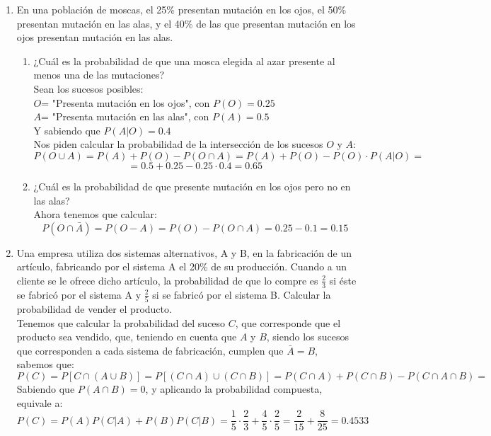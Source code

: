 \documentclass[a4paper,12pt]{article}
\begin{document}
\begin{enumerate}[label=\textbf{\arabic*.}]
\begin{enumerate}[label=\alph*)]
    \end{enumerate}
    

    \item En una población de moscas, el 25\% presentan mutación en los ojos, el 50\% presentan mutación en las alas, y el 40\% de las que presentan mutación en los ojos presentan mutación en las alas.
    
    \begin{enumerate}
        \item ¿Cuál es la probabilidad de que una mosca elegida al azar presente al menos una de las mutaciones?\\
        Sean los sucesos posibles:\\
        $O$= "Presenta mutación en los ojos", con $P(O)=0.25$\\
        $A$= "Presenta mutación en las alas", con $P(A)=0.5$\\
        Y sabiendo que $P(A|O)=0.4$\\
        Nos piden calcular la probabilidad de la intersección de los sucesos $O$ y $A$:
        $$P(O\cup A)= P(A)+P(O)-P(O\cap A)= P(A)+P(O)-P(O)\cdot P(A|O)=$$
        $$=0.5+0.25-0.25\cdot 0.4=0.65$$
        
        \item ¿Cuál es la probabilidad de que presente mutación en los ojos pero no en las alas?\\

        Ahora tenemos que calcular:
        $$P(O\cap \bar A)= P(O-A)= P(O)-P(O\cap A)=0.25-0.1=0.15$$
    \end{enumerate}
    
    \item Una empresa utiliza dos sistemas alternativos, A y B, en la fabricación de un artículo, fabricando por el sistema A el 20\% de su producción. Cuando a un cliente se le ofrece dicho artículo, la probabilidad de que lo compre es \( \frac{2}{3} \) si éste se fabricó por el sistema A y \( \frac{2}{5} \) si se fabricó por el sistema B. Calcular la probabilidad de vender el producto.\\

    Tenemos que calcular la probabilidad del suceso $C$, que corresponde  que el producto sea vendido, que, teniendo en cuenta que $A$ y $B$, siendo los sucesos que corresponden a cada sistema de fabricación, cumplen que $\bar A = B$, sabemos que:
    $$P(C)=P[C\cap (A\cup B)]=P[ (C\cap A) \cup (C\cap B)]=P(C\cap A) +  P(C\cap B) - P(C\cap A \cap B) = $$
    Sabiendo que $P(A\cap B)=0$, y aplicando la probabilidad compuesta, equivale a:
    $$P(C)= P(A)P(C|A)+P(B)P(C|B)= \frac{1}{5} \cdot \frac{2}{3}+\frac{4}{5}\cdot \frac{2}{5}=\frac{2}{15}+\frac{8}{25}=0.4533$$
    

\end{enumerate}
\end{document}

